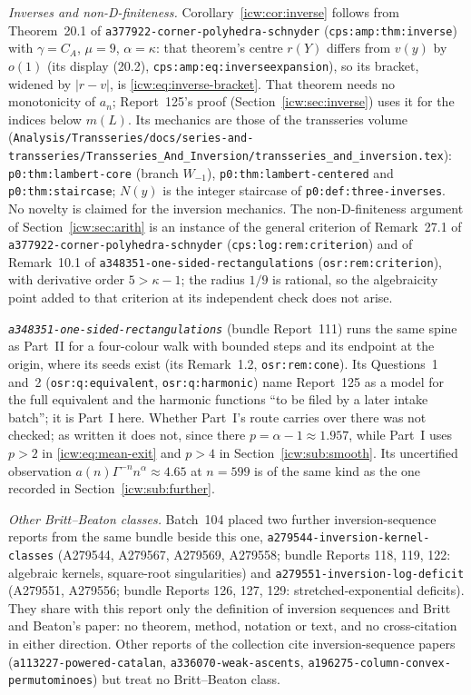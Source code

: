 \documentclass[11pt,letterpaper]{article}
\theoremstyle{remark}\newtheorem{remark}[theorem]{Remark}
\newcommand{\1}{\mathbf1}
\newcommand{\file}[1]{\textup{\nolinkurl{#1}}}
\begin{document}
\emph{Inverses and non-D-finiteness.} Corollary~\ref{icw:cor:inverse} follows from Theorem~20.1 of \file{a377922-corner-polyhedra-schnyder} (\texttt{cps:amp:thm:inverse}) with $\gamma=C_A$, $\mu=9$, $\alpha=\kappa$: that theorem's centre $r(Y)$ differs from $v(y)$ by $o(1)$ (its display (20.2), \texttt{cps:amp:eq:inverseexpansion}), so its bracket, widened by $|r-v|$, is \eqref{icw:eq:inverse-bracket}. That theorem needs no monotonicity of $a_n$; Report~125's proof (Section~\ref{icw:sec:inverse}) uses it for the indices below $m(L)$. Its mechanics are those of the transseries volume (\file{Analysis/Transseries/docs/series-and-transseries/Transseries_And_Inversion/transseries_and_inversion.tex}): \texttt{p0:thm:lambert-core} (branch $W_{-1}$), \texttt{p0:thm:lambert-centered} and \texttt{p0:thm:staircase}; $N(y)$ is the integer staircase of \texttt{p0:def:three-inverses}. No novelty is claimed for the inversion mechanics. The non-D-finiteness argument of Section~\ref{icw:sec:arith} is an instance of the general criterion of Remark~27.1 of \file{a377922-corner-polyhedra-schnyder} (\texttt{cps:log:rem:criterion}) and of Remark~10.1 of \file{a348351-one-sided-rectangulations} (\texttt{osr:rem:criterion}), with derivative order $5>\kappa-1$; the radius $1/9$ is rational, so the algebraicity point added to that criterion at its independent check does not arise.

\emph{\file{a348351-one-sided-rectangulations}} (bundle Report~111) runs the same spine as Part~II for a four-colour walk with bounded steps and its endpoint at the origin, where its seeds exist (its Remark~1.2, \texttt{osr:rem:cone}). Its Questions~1 and~2 (\texttt{osr:q:equivalent}, \texttt{osr:q:harmonic}) name Report~125 as a model for the full equivalent and the harmonic functions ``to be filed by a later intake batch''; it is Part~I here. Whether Part~I's route carries over there was not checked; as written it does not, since there $p=\alpha-1\approx1.957$, while Part~I uses $p>2$ in \eqref{icw:eq:mean-exit} and $p>4$ in Section~\ref{icw:sub:smooth}. Its uncertified observation $a(n)\Gamma^{-n}n^\alpha\approx4.65$ at $n=599$ is of the same kind as the one recorded in Section~\ref{icw:sub:further}.

\emph{Other Britt--Beaton classes.} Batch~104 placed two further inversion-sequence reports from the same bundle beside this one, \file{a279544-inversion-kernel-classes} (A279544, A279567, A279569, A279558; bundle Reports 118, 119, 122: algebraic kernels, square-root singularities) and \file{a279551-inversion-log-deficit} (A279551, A279556; bundle Reports 126, 127, 129: stretched-exponential deficits). They share with this report only the definition of inversion sequences and Britt and Beaton's paper: no theorem, method, notation or text, and no cross-citation in either direction. Other reports of the collection cite inversion-sequence papers (\file{a113227-powered-catalan}, \file{a336070-weak-ascents}, \file{a196275-column-convex-permutominoes}) but treat no Britt--Beaton class.
\end{document}
